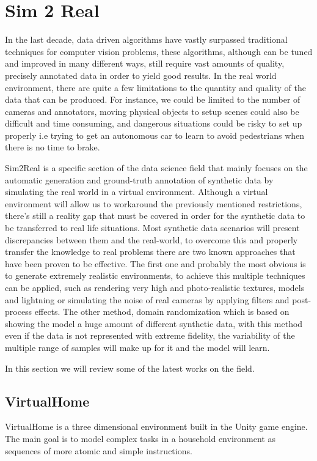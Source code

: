 \section{Sim 2 Real}
In the last decade, data driven algorithms have vastly surpassed traditional techniques for computer vision problems, these algorithms, although can be tuned and improved in many different ways, still require vast amounts of quality, precisely annotated data in order to yield good results. In the real world environment, there are quite a few limitations to the quantity and quality of the data that can be produced. For instance, we could be limited to the number of cameras and annotators, moving physical objects to setup scenes could also be difficult and time consuming, and dangerous situations could be risky to set up properly i.e trying to get an autonomous car to learn to avoid pedestrians when there is no time to brake.
    
Sim2Real is a specific section of the data science field that mainly focuses on the automatic generation and ground-truth annotation of synthetic data by simulating the real world in a virtual environment. Although a virtual environment will allow us to workaround the previously mentioned restrictions, there's still a reality gap that must be covered in order for the synthetic data to be transferred to real life situations. Most synthetic data scenarios will present discrepancies between them and the real-world, to overcome this and properly transfer the knowledge to real problems there are two known approaches that have been proven to be effective. The first one and probably the most obvious is to generate extremely realistic environments, to achieve this multiple techniques can be applied, such as rendering very high and photo-realistic textures, models and lightning or simulating the noise of real cameras by applying filters and post-process effects. The other method, domain randomization \cite{DBLP:journals/corr/TobinFRSZA17} which is based on showing the model a huge amount of different synthetic data, with this method even if the data is not represented with extreme fidelity, the variability of the multiple range of samples will make up for it and the model will learn.

In this section we will review some of the latest works on the field.

\subsection{VirtualHome}
VirtualHome is a three dimensional environment built in the Unity game engine. The main goal is to model complex tasks in a household environment as sequences of more atomic and simple instructions.
 

